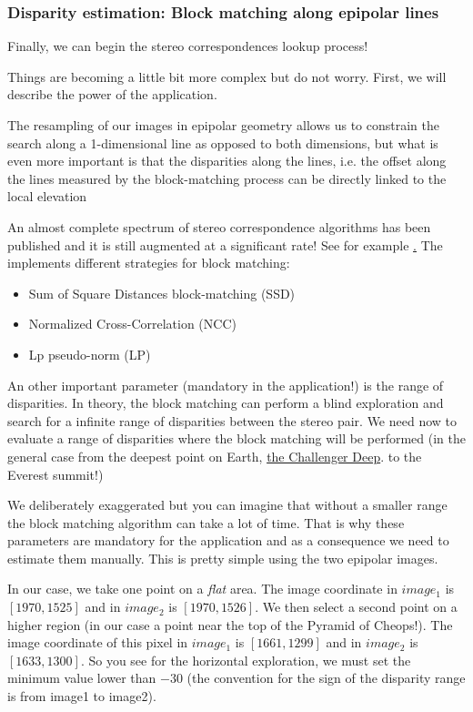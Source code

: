 \subsubsection{Disparity estimation: Block matching along epipolar lines}

Finally, we can begin the stereo correspondences lookup process!

Things are becoming a little bit more complex but do not worry. First,
we will describe the power of the 
application.

The resampling of our images in epipolar geometry allows us to
constrain the search along a 1-dimensional line as opposed to both
dimensions, but what is even more important is that the disparities
along the lines, i.e. the offset along the lines measured by the
block-matching process can be directly linked to the local elevation

An almost complete spectrum of stereo correspondence algorithms has been
published and it is still augmented at a significant rate!
See for example \href{http://en.wikipedia.org/wiki/Block-matching_algorithm}. The
\otb implements different strategies for block matching:

\begin{itemize}
\item Sum of Square Distances block-matching (SSD)
\item Normalized Cross-Correlation (NCC)
\item Lp pseudo-norm (LP)
\end{itemize}

An other important parameter (mandatory in the application!) is the
range of disparities. In theory, the block matching can perform a
blind exploration and search for a infinite range of disparities
between the stereo pair. We need now to evaluate a range of
disparities where the block matching will be performed (in the general
case from the deepest point on
Earth, \href{http://en.wikipedia.org/wiki/Challenger_Deep}{the
Challenger Deep}.  to the Everest summit!)

We deliberately exaggerated but you can imagine that without a smaller
range the block matching algorithm can take a lot of time.  That is why
these parameters are mandatory for the application and as a
consequence we need to estimate them manually. This is pretty simple
using the two epipolar images.

In our case, we take one point on a \textit{flat} area. The image coordinate in $image_{1}$
is $[1970,1525]$ and in $image_{2}$ is $[1970,1526]$. We then select a second
point on a higher region (in our case a point near the top of the Pyramid of
Cheops!). The image coordinate of this pixel in $image_{1}$ is $[1661,1299]$ and
in $image_{2}$ is $[1633,1300]$.  So you see for the horizontal exploration, we
must set the minimum value lower than $-30$ (the convention for the sign of the
disparity range is from image1 to image2).

